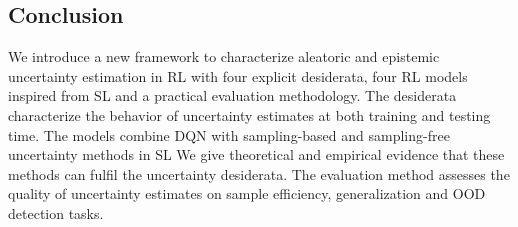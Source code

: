 \subsection*{Conclusion}
\label{sec:conclusion_011}

We introduce a new framework to characterize aleatoric and epistemic uncertainty estimation in RL with four explicit desiderata, four RL models inspired from SL and a practical evaluation methodology. The desiderata characterize the behavior of uncertainty estimates at both training and testing time. The models combine DQN with sampling-based and sampling-free uncertainty methods in SL 
We give theoretical and empirical evidence that these methods can fulfil the uncertainty desiderata. The evaluation method assesses the quality of uncertainty estimates on sample efficiency, generalization and OOD detection tasks.